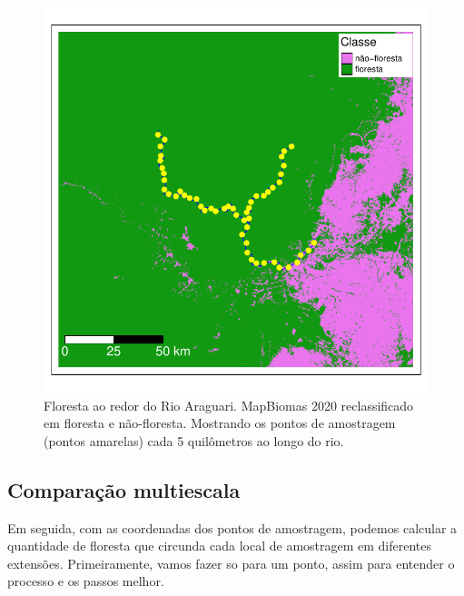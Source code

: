 \documentclass[
]{article}
\begin{document}
\begin{figure}
\centering
\includegraphics{epr_files/figure-latex/unnamed-chunk-16-1.pdf}
\caption{\label{fig:unnamed-chunk-16}Floresta ao redor do Rio Araguari. MapBiomas 2020 reclassificado em floresta e não-floresta. Mostrando os pontos de amostragem (pontos amarelas) cada 5 quilômetros ao longo do rio.}
\end{figure}

\hypertarget{comparauxe7uxe3o-multiescala}{%
\subsection{Comparação multiescala}\label{comparauxe7uxe3o-multiescala}}

Em seguida, com as coordenadas dos pontos de amostragem, podemos calcular a quantidade de floresta que circunda cada local de amostragem em diferentes extensões. Primeiramente, vamos fazer so para um ponto, assim para entender o processo e os passos melhor.
\end{document}
